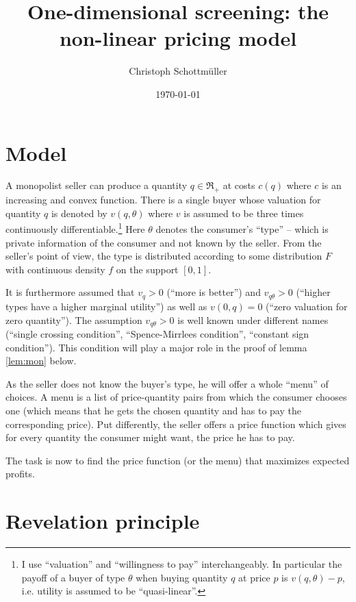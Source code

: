 \documentclass[12pt]{article}
\title{One-dimensional screening: the non-linear pricing model}
\author{Christoph Schottmüller}
\date{\today}
\begin{document}
\maketitle

\section{Model}
\label{sec:model}

A monopolist seller can produce a quantity $q\in\Re_+$ at costs $c(q)$ where $c$ is an increasing and convex function. There is a single buyer whose valuation for quantity $q$ is denoted by $v(q,\theta) $ where $v$ is assumed to be three times continuously differentiable.\footnote{I use ``valuation'' and ``willingness to pay'' interchangeably. In particular the payoff of a buyer of type $\theta $ when buying quantity $q$ at price $p$ is $v(q,\theta )-p$, i.e. utility is assumed to be ``quasi-linear''.}  Here $\theta $ denotes the consumer's ``type'' -- which is private information of the consumer and not known by the seller. From the seller's point of view, the type is distributed according to some distribution $F$ with continuous density $f$ on the support $[0,1]$.

It is furthermore assumed that $v_q>0$ (``more is better'') and $v_{q\theta }>0$ (``higher types have a higher marginal utility'') as well as $v(0,q)=0$ (``zero valuation for zero quantity'').  The assumption $v_{q\theta }>0$ is well known under different names (``single crossing condition'', ``Spence-Mirrlees condition'', ``constant sign condition''). This condition will play a major role in the proof of lemma \ref{lem:mon} below.

As the seller does not know the buyer's type, he will offer a whole ``menu'' of choices. A menu is a list of price-quantity pairs from which the consumer chooses one (which means that he gets the chosen quantity and has to pay the corresponding price). Put differently, the seller offers a price function which gives for every quantity the consumer might want, the price he has to pay.

The task is now to find the price function (or the menu) that maximizes expected profits.

\section{Revelation principle}
\label{sec:revelation-principle}
\end{document}
